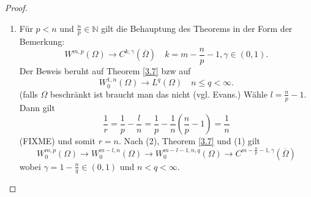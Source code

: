 \documentclass[
paper=a4,
bibtotocnumbered,
liststotocnumbered,
tablecaptionabove,
pointlessnumbers,
twoside,
openright,
10pt
]
{report}
\theoremstyle{definition}
\numberwithin{equation}{chapter}
\begin{document}
\begin{proof}
\begin{enumerate}
	\begin{proof}
			Wähle $l\in \mathbb N$ mit
			\begin{equation}
				l < \frac{n}{p} < l+1
			\end{equation}
			d.h. $l= \left [ \frac{n}{p}\right ]$. dann gilt
			\begin{equation}
			\frac{1}{r} = \frac{1}{p} - \frac{l}{n} = \frac{1}{n} \left ( \frac{n}{p} -l\right ) \in (0, \frac{1}{n}).
			\end{equation}
			Also ist $r>n$ und $l < \frac{n}{p} <m$. Aus (2) und (1) folgt also
			\begin{equation}
				W_=^{m,p}(\Omega) \to W_0^{m-l,r}(\Omega) \to C^{m-l-1, \gamma}(\overline{\Omega})
			\end{equation}
			wobei 
			\begin{equation}
				\gamma = 1-\frac{n}{r} = 1-(\frac{n}{p}-l) = l+1 - \frac{n}{p} = [\frac{n}{p}] + 1 - \frac{n}{p}.
			\end{equation}
 		\end{proof}
 	\item Für $p <n$ und $\frac{n}{p} \in \mathbb N$ gilt die Behauptung des Theorems in der Form der Bemerkung:
 		\begin{equation}
 		W^{m,p}(\Omega) \to C^{k,\gamma}(\overline{\Omega}) \quad k=m-\frac{n}{p} -1, \gamma \in (0,1).
 		\end{equation}
 		Der Beweis beruht auf Theorem \ref{3.7} bzw auf
 		\begin{equation}
 			W_0^{1,n}(\Omega) \to L^q(\Omega) \quad n \le q <\infty.
 		\end{equation}
 		(falls $\Omega$ beschränkt ist braucht man das nicht (vgl. Evans.) Wähle $l=\frac{n}{p}-1$. Dann gilt
		\begin{equation}
			\frac{1}{r} = \frac{1}{p} - \frac{l}{n} = \frac{1}{p} - \frac{1}{n} \left ( \frac{n}{p} -1 \right ) = \frac{1}{n}
		\end{equation} (FIXME)
		und somit $r=n$. Nach (2), Theorem \ref{3.7} und (1) gilt
		\begin{equation}
			W_0^{m,p}(\Omega) \to W_0^{m-l,n}(\Omega)\to W_0^{m-l-1,n,q}(\Omega) \to C^{m-\frac{n}{p}-1, \gamma} (\overline \Omega)
		\end{equation}
		wobei $\gamma = 1- \frac{n}{q} \in (0,1)$ und $n<q<\infty$.
 \end{enumerate}
 \end{proof}
\end{document}
